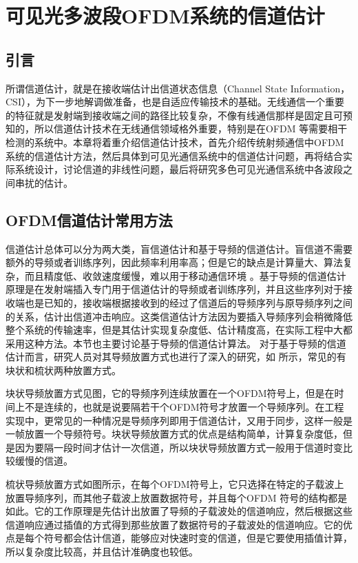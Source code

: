\chapter{可见光多波段OFDM系统的信道估计}
\section{引言}
所谓信道估计，就是在接收端估计出信道状态信息（Channel State Information，CSI），为下一步地解调做准备，也是自适应传输技术的基础。无线通信一个重要的特征就是发射端到接收端之间的路径比较复杂，不像有线通信那样是固定且可预知的，所以信道估计技术在无线通信领域格外重要，特别是在OFDM 等需要相干检测的系统中。本章将着重介绍信道估计技术，首先介绍传统射频通信中OFDM 系统的信道估计方法，然后具体到可见光通信系统中的信道估计问题，再将结合实际系统设计，讨论信道的非线性问题，最后将研究多色可见光通信系统中各波段之间串扰的估计。
\section{OFDM信道估计常用方法}
信道估计总体可以分为两大类，盲信道估计和基于导频的信道估计。盲信道不需要额外的导频或者训练序列，因此频率利用率高；但是它的缺点是计算量大、算法复杂，而且精度低、收敛速度缓慢，难以用于移动通信环境
\cite{石钧2012ofdm}。基于导频的信道估计原理是在发射端插入专门用于信道估计的导频或者训练序列，并且这些序列对于接收端也是已知的，接收端根据接收到的经过了信道后的导频序列与原导频序列之间的关系，估计出信道冲击响应。这类信道估计方法因为要插入导频序列会稍微降低整个系统的传输速率，但是其估计实现复杂度低、估计精度高，在实际工程中大都采用这种方法。本节也主要讨论基于导频的信道估计算法。
对于基于导频的信道估计而言，研究人员对其导频放置方式也进行了深入的研究，如 所示，常见的有块状和梳状两种放置方式。

块状导频放置方式见图，它的导频序列连续放置在一个OFDM符号上，但是在时间上不是连续的，也就是说要隔若干个OFDM符号才放置一个导频序列。在工程实现中，更常见的一种情况是导频序列即用于信道估计，又用于同步，这样一般是一帧放置一个导频符号。块状导频放置方式的优点是结构简单，计算复杂度低，但是因为要隔一段时间才估计一次信道，所以块状导频放置方式一般用于信道时变比较缓慢的信道。

梳状导频放置方式如图所示，在每个OFDM符号上，它只选择在特定的子载波上放置导频序列，而其他子载波上放置数据符号，并且每个OFDM 符号的结构都是如此。它的工作原理是先估计出放置了导频的子载波处的信道响应，然后根据这些信道响应通过插值的方式得到那些放置了数据符号的子载波处的信道响应。它的优点是每个符号都会估计信道，能够应对快速时变的信道，但是它要使用插值计算，所以复杂度比较高，并且估计准确度也较低。

